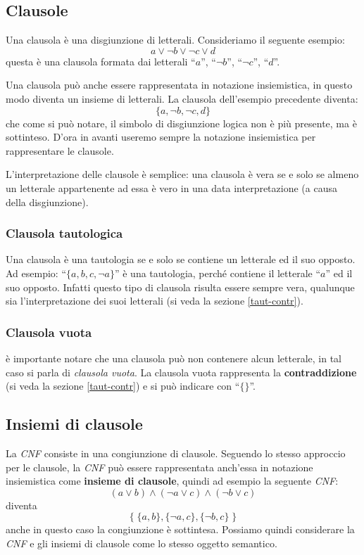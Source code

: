 \documentclass[a4paper,12pt]{report}
\begin{document}
\subsection{Clausole}
Una clausola è una disgiunzione di letterali. Consideriamo il seguente esempio:
\[ a \lor \lnot b \lor \lnot c \lor d \] 
questa è una clausola formata dai letterali ``$a$'', ``$\lnot b$'', ``$\lnot c$'', ``$d$''.

Una clausola può anche essere rappresentata in notazione insiemistica, in questo modo diventa un insieme di letterali. La clausola dell'esempio precedente diventa:
\[ \{a, \lnot b, \lnot c, d\}\]
che come si può notare, il simbolo di disgiunzione logica non è più presente, ma è sottinteso. D'ora in avanti useremo sempre la notazione insiemistica per rappresentare le clausole.

L'interpretazione delle clausole è semplice: una clausola è vera se e solo se almeno un letterale appartenente ad essa è vero in una data interpretazione (a causa della disgiunzione).

\subsubsection{Clausola tautologica}
Una clausola è una tautologia se e solo se contiene un letterale ed il suo opposto. Ad esempio: ``$\{ a, b, c, \lnot a \}$'' è una tautologia, perché contiene il letterale ``$a$'' ed il suo opposto. Infatti questo tipo di clausola risulta essere sempre vera, qualunque sia l'interpretazione dei suoi letterali (si veda la sezione \ref{taut-contr}).

\subsubsection{Clausola vuota}
è importante notare che una clausola può non contenere alcun letterale, in tal caso si parla di \emph{clausola vuota}. La clausola vuota rappresenta la \textbf{contraddizione} (si veda la sezione \ref{taut-contr}) e si può indicare con ``$\{ \}$''.

\subsection{Insiemi di clausole}
La \emph{CNF} consiste in una congiunzione di clausole. Seguendo lo stesso approccio per le clausole, la \emph{CNF} può essere rappresentata anch'essa in notazione insiemistica come \textbf{insieme di clausole}, quindi ad esempio la seguente \emph{CNF}:
\[ (a \lor b) \land (\lnot a \lor c) \land (\lnot b \lor c) \]
diventa
\[\{ \; \{a, b\}, \{\lnot a, c\}, \{\lnot b, c\} \; \}\]
anche in questo caso la congiunzione è sottintesa. Possiamo quindi considerare la \emph{CNF} e gli insiemi di clausole come lo stesso oggetto semantico.
\end{document}
